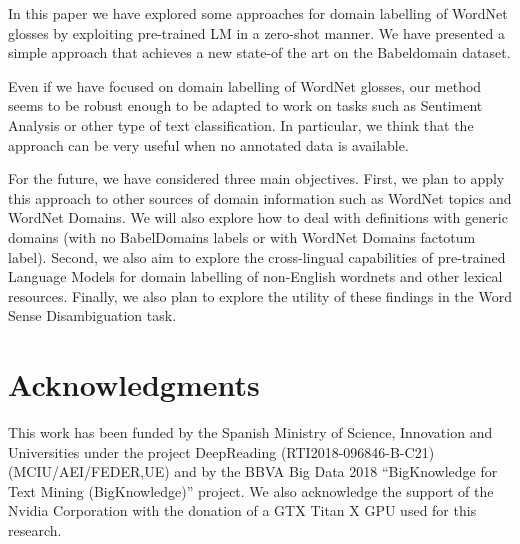 \documentclass[11pt]{article}
\begin{document}
In this paper we have explored some approaches for domain labelling of WordNet glosses by exploiting pre-trained LM in a zero-shot manner. We have presented a simple approach that achieves a new state-of the art on the Babeldomain dataset.

Even if we have focused on domain labelling of WordNet glosses, our method seems to be robust enough to be adapted to work on tasks such as Sentiment Analysis or other type of text classification. In particular, we think that the approach can be very useful when no annotated data is available.

For the future, we have considered three main objectives. First, we plan to apply this approach to other sources of domain information such as WordNet topics and WordNet Domains. We will also explore how to deal with definitions with generic domains (with no BabelDomains labels or with WordNet Domains factotum label). Second, we also aim to explore the cross-lingual capabilities of pre-trained Language Models for domain labelling of non-English wordnets and other lexical resources. Finally, we also plan to explore the utility of these findings in the Word Sense Disambiguation task.

\section*{Acknowledgments}

This work has been funded by the Spanish Ministry of Science, Innovation and Universities under the project DeepReading  (RTI2018-096846-B-C21)  (MCIU/AEI/FEDER,UE) and by the BBVA Big Data 2018 “BigKnowledge for Text Mining (BigKnowledge)” project. We  also  acknowledge  the  support  of  the  Nvidia Corporation with the donation of a GTX Titan X GPU used for this research.





\end{document}
